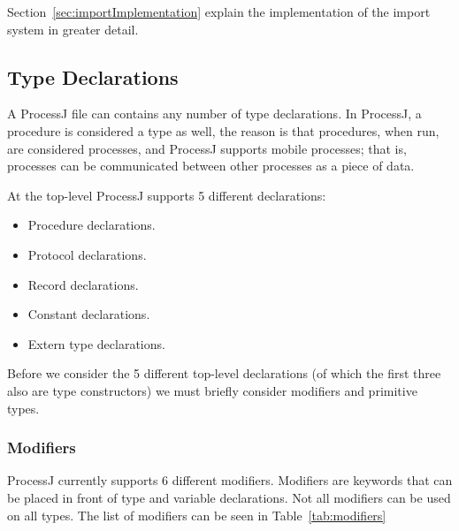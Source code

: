 \documentclass[pdflatex,11pt,letter]{article}
\begin{document}
Section~\ref{sec:importImplementation} explain the implementation of the import system in greater detail.



\subsection{Type Declarations}

A ProcessJ file can contains any number of type declarations. In ProcessJ, a procedure is considered a type as well, the reason is that procedures, when run, are considered processes, and ProcessJ supports mobile processes; that is, processes can be communicated between other processes as a piece of data.

At the top-level ProcessJ supports 5 different declarations:
\begin{itemize}
\item Procedure declarations.
\item Protocol declarations.
\item Record declarations.
\item Constant declarations.
\item Extern type declarations.
\end{itemize}
Before we consider the 5 different top-level declarations (of which the first three also are type constructors) we must briefly consider modifiers and primitive types.

\subsubsection{Modifiers}

ProcessJ currently supports 6 different modifiers. Modifiers are keywords that can be placed in front of type and variable declarations. Not all modifiers can be used on all types. The list of modifiers can be seen in Table~\ref{tab:modifiers}
\end{document}
